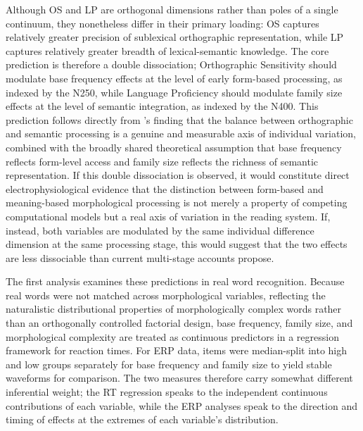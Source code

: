 \documentclass[utf8]{FrontiersinHarvard} %
\begin{document}
	Although OS and LP are orthogonal dimensions rather than poles of a single continuum, they nonetheless differ in their primary loading: OS captures relatively greater precision of sublexical orthographic representation, while LP captures relatively greater breadth of lexical-semantic knowledge. The core prediction is therefore a double dissociation; Orthographic Sensitivity should modulate base frequency effects at the level of early form-based processing, as indexed by the N250, while Language Proficiency should modulate family size effects at the level of semantic integration, as indexed by the N400. This prediction follows directly from \citeauthor{andrewsMorphologicalPrimingStronger2013}'s \citeyearpar{andrewsMorphologicalPrimingStronger2013} finding that the balance between orthographic and semantic processing is a genuine and measurable axis of individual variation, combined with the broadly shared theoretical assumption that base frequency reflects form-level access and family size reflects the richness of semantic representation. If this double dissociation is observed, it would constitute direct electrophysiological evidence that the distinction between form-based and meaning-based morphological processing is not merely a property of competing computational models but a real axis of variation in the reading system. If, instead, both variables are modulated by the same individual difference dimension at the same processing stage, this would suggest that the two effects are less dissociable than current multi-stage accounts propose.
	
	The first analysis examines these predictions in real word recognition. Because real words were not matched across morphological variables, reflecting the naturalistic distributional properties of morphologically complex words rather than an orthogonally controlled factorial design, base frequency, family size, and morphological complexity are treated as continuous predictors in a regression framework for reaction times. For ERP data, items were median-split into high and low groups separately for base frequency and family size to yield stable waveforms for comparison. The two measures therefore carry somewhat different inferential weight; the RT regression speaks to the independent continuous contributions of each variable, while the ERP analyses speak to the direction and timing of effects at the extremes of each variable's distribution.
	
\end{document}
